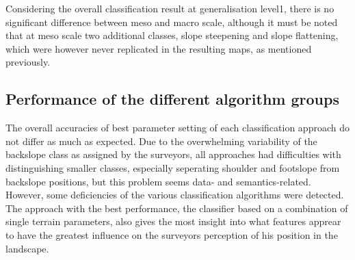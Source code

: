 \documentclass[preprint,12pt,authoryear]{elsarticle}
\begin{document}
Considering the overall classification result at generalisation level1, there is no significant difference between meso and macro scale, although it must be noted that at meso scale two additional classes, slope steepening and slope flattening, which were however never replicated in the resulting maps, as mentioned previously.


\subsection{Performance of the different algorithm groups}  
The overall accuracies of best parameter setting of each classification approach do not differ as much as expected. Due to the overwhelming variability of the backslope class as assigned by the surveyors, all approaches had difficulties with distinguishing smaller classes, especially seperating shoulder and footslope from backslope positions, but this problem seems data- and semantics-related. However, some deficiencies of the various classification algorithms were detected.
The approach with the best performance, the classifier based on a combination of single terrain parameters, also gives the most insight into what features apprear to have the greatest influence on the surveyors perception of his position in the landscape. 
\end{document}
